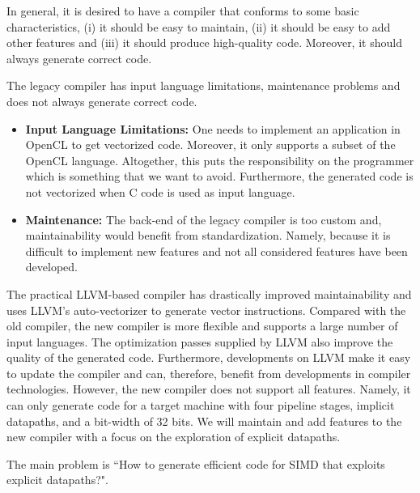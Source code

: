 In general, it is desired to have a compiler that conforms to some basic characteristics, (i) it should be easy to maintain, (ii) it should be easy to add other features and (iii) it should produce high-quality code. Moreover, it should always generate correct code.

The legacy compiler has input language limitations, maintenance problems and 
does not always generate correct code.
\begin{itemize}
\item \textbf{Input Language Limitations:} One needs to implement an application in OpenCL to get vectorized code. Moreover, it only supports a subset of the OpenCL language. Altogether, this puts the responsibility on the programmer which is something that we want to avoid. Furthermore, the generated code is not vectorized when C code is used as input language. 
\item \textbf{Maintenance:} The back-end of the legacy compiler is too custom and, maintainability would benefit from standardization. Namely, because it is difficult to implement new features and not all considered features have been developed.   
\end{itemize}

The practical LLVM-based compiler has drastically improved maintainability and uses LLVM's auto-vectorizer to generate vector instructions. Compared with the old compiler, the new compiler is more flexible and supports a large number of input languages. The optimization passes supplied by LLVM also improve the quality of the generated code. Furthermore, developments on LLVM make it easy to update the compiler and can, therefore, benefit from developments in compiler technologies. However, the new compiler does not support all features. Namely, it can only generate code for a target machine with four pipeline stages, implicit datapaths, and a bit-width of 32 bits. We will maintain and add features to the new compiler with a focus on the exploration of explicit datapaths.

The main problem is ``How to generate efficient code for SIMD that exploits explicit datapaths?". 


